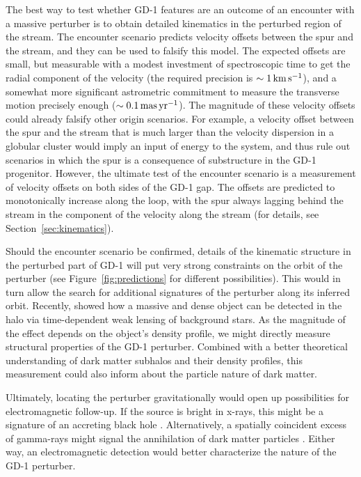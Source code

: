 \documentclass[twocolumn]{aastex62}
\begin{document}
The best way to test whether GD-1 features are an outcome of an encounter with a massive perturber is to obtain detailed kinematics in the perturbed region of the stream.
The encounter scenario predicts velocity offsets between the spur and the stream, and they can be used to falsify this model.
The expected offsets are small, but measurable with a modest investment of spectroscopic time to get the radial component of the velocity (the required precision is $\sim1\,\rm km\,s^{-1}$), and a somewhat more significant astrometric commitment to measure the transverse motion precisely enough ($\sim0.1\,\rm mas\,yr^{-1}$).
The magnitude of these velocity offsets could already falsify other origin scenarios.
For example, a velocity offset between the spur and the stream that is much larger than the velocity dispersion in a globular cluster would imply an input of energy to the system, and thus rule out scenarios in which the spur is a consequence of substructure in the GD-1 progenitor.
However, the ultimate test of the encounter scenario is a measurement of velocity offsets on both sides of the GD-1 gap.
The offsets are predicted to monotonically increase along the loop, with the spur always lagging behind the stream in the component of the velocity along the stream (for details, see Section~\ref{sec:kinematics}).

Should the encounter scenario be confirmed, details of the kinematic structure in the perturbed part of GD-1 will put very strong constraints on the orbit of the perturber (see Figure~\ref{fig:predictions} for different possibilities).
This would in turn allow the search for additional signatures of the perturber along its inferred orbit.
Recently, \citet{vantilburg2018} showed how a massive and dense object can be detected in the halo via time-dependent weak lensing of background stars.
As the magnitude of the effect depends on the object's density profile, we might directly measure structural properties of the GD-1 perturber.
Combined with a better theoretical understanding of dark matter subhalos and their density profiles, this measurement could also inform about the particle nature of dark matter.

Ultimately, locating the perturber gravitationally would open up possibilities for electromagnetic follow-up.
If the source is bright in x-rays, this might be a signature of an accreting black hole \citep[e.g.,][]{bailyn1995}.
Alternatively, a spatially coincident excess of gamma-rays might signal the annihilation of dark matter particles \citep[similarly to the results of searches at the locations of dwarf galaxies, e.g.,][]{hooper2015}.
Either way, an electromagnetic detection would better characterize the nature of the GD-1 perturber.
\end{document}
